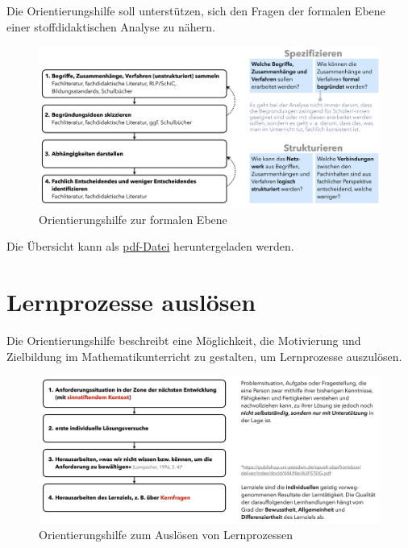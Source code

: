 \documentclass[
]{scrbook}
\theoremstyle{definition}
\theoremstyle{definition}
\theoremstyle{definition}
\theoremstyle{definition}
\theoremstyle{remark}
\begin{document}
Die Orientierungshilfe soll unterstützen, sich den Fragen der formalen Ebene einer stoffdidaktischen Analyse zu nähern.

\begin{figure}

{\centering \includegraphics[width=0.9\linewidth]{pictures/B-OrientierungshilfeFormaleEbene} 

}

\caption{Orientierungshilfe zur formalen Ebene}\label{fig:OrientierungFormal}
\end{figure}

Die Übersicht kann als \href{files/Stoffdidaktik2024-OrientierungshilfeFormaleEbene.pdf}{pdf-Datei} heruntergeladen werden.

\section{Lernprozesse auslösen}\label{orientierungshilfe-lernprozesse-ausloesen}

Die Orientierungshilfe beschreibt eine Möglichkeit, die Motivierung und Zielbildung im Mathematikunterricht zu gestalten, um Lernprozesse auszulösen.

\begin{figure}

{\centering \includegraphics[width=0.9\linewidth]{pictures/B-OrientierungshilfeLernprozesseAusloesen} 

}

\caption{Orientierungshilfe zum Auslösen von Lernprozessen}\label{fig:OrientierungAusloesen}
\end{figure}
\end{document}
